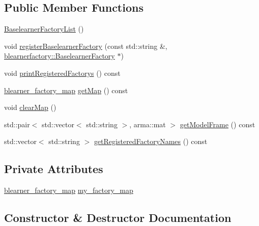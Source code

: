 \subsection*{Public Member Functions}
\begin{DoxyCompactItemize}
\item 
\hyperlink{classblearnerlist_1_1_baselearner_factory_list_a438e2cfeecfdecaff27624225819f99b}{Baselearner\+Factory\+List} ()
\item 
void \hyperlink{classblearnerlist_1_1_baselearner_factory_list_a6f5d8eb26f5f5ae4856d62eb9d649f4f}{register\+Baselearner\+Factory} (const std\+::string \&, \hyperlink{classblearnerfactory_1_1_baselearner_factory}{blearnerfactory\+::\+Baselearner\+Factory} $\ast$)
\item 
void \hyperlink{classblearnerlist_1_1_baselearner_factory_list_a1d0242c96044f78c448183ed4a97e079}{print\+Registered\+Factorys} () const
\item 
\hyperlink{baselearner__factory__list_8h_a058570e00ae11b882cfed36eb40be025}{blearner\+\_\+factory\+\_\+map} \hyperlink{classblearnerlist_1_1_baselearner_factory_list_aeb573190a689af611e2f80ca8ed65d95}{get\+Map} () const
\item 
void \hyperlink{classblearnerlist_1_1_baselearner_factory_list_aacbe97968ca672d2481d5f8dce0bbf94}{clear\+Map} ()
\item 
std\+::pair$<$ std\+::vector$<$ std\+::string $>$, arma\+::mat $>$ \hyperlink{classblearnerlist_1_1_baselearner_factory_list_a1f0d601a978c0f50cf9b6228c1f92ce8}{get\+Model\+Frame} () const
\item 
std\+::vector$<$ std\+::string $>$ \hyperlink{classblearnerlist_1_1_baselearner_factory_list_ac4dc76e908affe9aae7b7278cec22875}{get\+Registered\+Factory\+Names} () const
\end{DoxyCompactItemize}
\subsection*{Private Attributes}
\begin{DoxyCompactItemize}
\item 
\hyperlink{baselearner__factory__list_8h_a058570e00ae11b882cfed36eb40be025}{blearner\+\_\+factory\+\_\+map} \hyperlink{classblearnerlist_1_1_baselearner_factory_list_a839e9b3f1bf73e995c35f7a6d0f64113}{my\+\_\+factory\+\_\+map}
\end{DoxyCompactItemize}


\subsection{Constructor \& Destructor Documentation}
\mbox{\label{classblearnerlist_1_1_baselearner_factory_list_a438e2cfeecfdecaff27624225819f99b}} 
